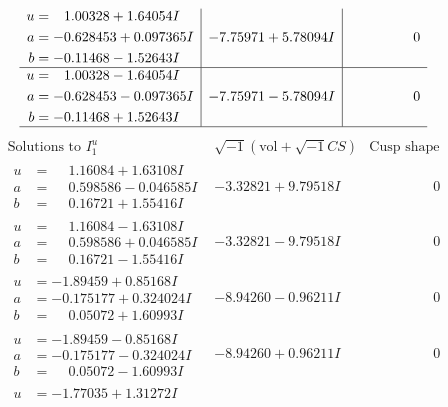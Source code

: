 \documentclass[1p]{elsarticle_modified}
\theoremstyle{definition}
\newcommand{\I}{\sqrt{-1}}
\begin{document}
$$\begin{array}{c|c|c}
\begin{aligned}
u &= \phantom{-}1.00328 + 1.64054 I \\
a &= -0.628453 + 0.097365 I \\
b &= -0.11468 - 1.52643 I\end{aligned}
 & -7.75971 + 5.78094 I & \phantom{-0.000000 } 0 \\ \hline\begin{aligned}
u &= \phantom{-}1.00328 - 1.64054 I \\
a &= -0.628453 - 0.097365 I \\
b &= -0.11468 + 1.52643 I\end{aligned}
 & -7.75971 - 5.78094 I & \phantom{-0.000000 } 0\\
 \hline 
 \end{array}$$\newpage$$\begin{array}{c|c|c}  
\text{Solutions to }I^u_{1}& \I (\text{vol} + \sqrt{-1}CS) & \text{Cusp shape}\\
 \hline 
\begin{aligned}
u &= \phantom{-}1.16084 + 1.63108 I \\
a &= \phantom{-}0.598586 - 0.046585 I \\
b &= \phantom{-}0.16721 + 1.55416 I\end{aligned}
 & -3.32821 + 9.79518 I & \phantom{-0.000000 } 0 \\ \hline\begin{aligned}
u &= \phantom{-}1.16084 - 1.63108 I \\
a &= \phantom{-}0.598586 + 0.046585 I \\
b &= \phantom{-}0.16721 - 1.55416 I\end{aligned}
 & -3.32821 - 9.79518 I & \phantom{-0.000000 } 0 \\ \hline\begin{aligned}
u &= -1.89459 + 0.85168 I \\
a &= -0.175177 + 0.324024 I \\
b &= \phantom{-}0.05072 + 1.60993 I\end{aligned}
 & -8.94260 - 0.96211 I & \phantom{-0.000000 } 0 \\ \hline\begin{aligned}
u &= -1.89459 - 0.85168 I \\
a &= -0.175177 - 0.324024 I \\
b &= \phantom{-}0.05072 - 1.60993 I\end{aligned}
 & -8.94260 + 0.96211 I & \phantom{-0.000000 } 0 \\ \hline\begin{aligned}
u &= -1.77035 + 1.31272 I \\

\end{aligned}
\end{array}$$
\end{document}
